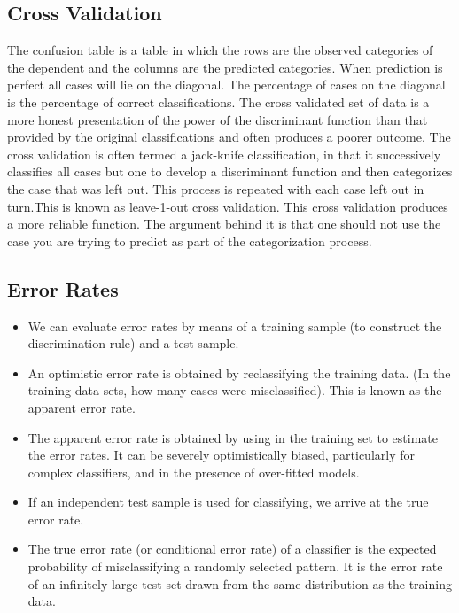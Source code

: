 \documentclass[12pt]{article}
\begin{document}
\subsection*{ Cross Validation}
The confusion table is a table in which the rows are the observed categories of
the dependent and the columns are the predicted categories. When prediction
is perfect all cases will lie on the diagonal. The percentage of cases on the
diagonal is the percentage of correct classifications. The cross validated set of
data is a more honest presentation of the power of the discriminant function
than that provided by the original classifications and often produces a poorer
outcome. The cross validation is often termed a jack-knife classification, in
that it successively classifies all cases but one to develop a discriminant
function and then categorizes the case that was left out. This process is
repeated with each case left out in turn.This is known as leave-1-out cross
validation.
This cross validation produces a more reliable function. The argument
behind it is that one should not use the case you are trying to predict as part
of the categorization process.
\subsection*{Error Rates}
\begin{itemize}
	\item We can evaluate error rates by means of a training sample (to construct the
	discrimination rule) and a test sample.
	\item An optimistic error rate is obtained by reclassifying the training data. (In
	the training data sets, how many cases were misclassified). This is known
	as the apparent error rate.
	\item The apparent error rate is obtained by using in the training set to estimate
	the error rates. It can be severely optimistically biased, particularly for
	complex classifiers, and in the presence of over-fitted models.
	\item If an independent test sample is used for classifying, we arrive at the true
	error rate.
		\item The true error rate (or conditional error rate) of a classifier is the
	expected probability of misclassifying a randomly selected pattern. It is the
	error rate of an infinitely large test set drawn from the same distribution as
	the training data.
\end{itemize}
\end{document}
